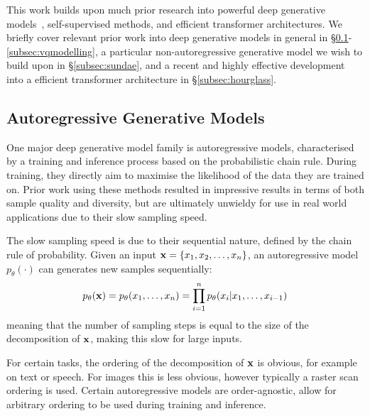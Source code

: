 This work builds upon much prior research into powerful deep generative
models~\cite{bondtaylor2021review}, self-supervised methods, and efficient
transformer architectures. We briefly cover relevant prior work into deep
generative models in general in \S\ref{subsec:agm}-\ref{subsec:vqmodelling}, a
particular non-autoregressive generative model we wish to build upon in
\S\ref{subsec:sundae}, and a recent and highly effective development into a
efficient transformer architecture in \S\ref{subsec:hourglass}.

\subsection{Autoregressive Generative Models}
\label{subsec:agm}
One major deep generative model family is autoregressive models, characterised
by a training and inference process based on the probabilistic chain rule.
During training, they directly aim to maximise the likelihood of the data they
are trained on. Prior work using these methods resulted in impressive results in
terms of both sample quality and diversity, but are ultimately unwieldy for use
in real world applications due to their slow sampling speed.

The slow sampling speed is due to their sequential nature, defined by the chain
rule of probability. Given an input $\mathbf{x} = \{ x_{1}, x_{2}, \dots,
x_{n} \}$, an autoregressive model $p_\theta(\cdot)$ can generates new
samples sequentially:
\begin{equation}\label{eq:ar}
    p_\theta(\mathbf{x}) = p_\theta(x_{1}, \dots, x_{n}) =
    \prod\limits^{n}_{i=1} p_\theta(x_{i} \vert x_{1}, \dots, x_{i-1})
\end{equation}
meaning that the number of sampling steps is equal to the size of the
decomposition of $\mathbf{x}$, making this slow for large inputs.

For certain tasks, the ordering of the decomposition of $\mathbf{x}$ is obvious, for
example on text or speech. For images this is less obvious, however typically a
raster scan ordering is used. Certain autoregressive models are order-agnostic,
allow for arbitrary ordering to be used during training and inference.


